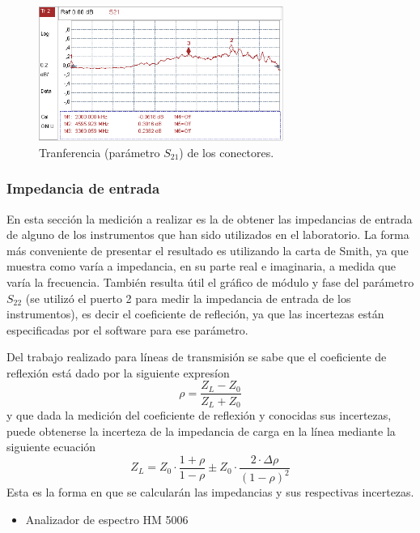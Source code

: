 \documentclass[a4paper,10pt]{article}
\begin{document}
		\begin{figure}[!htb]
			\centering
			\includegraphics[width=8cm]
			{Imagenes/transferenciaconector.png}
			\caption{Tranferencia (par\'ametro $S_{21}$) de los conectores.}
			\label{tranferenciaconectorrr} 
		\end{figure}
		
		\subsubsection{Impedancia de entrada}
		\indent En esta secci\'on la medici\'on a realizar es la de obtener las 
		impedancias de entrada de alguno de los instrumentos que han sido 
		utilizados en el laboratorio. La forma m\'as conveniente de presentar el
		resultado es utilizando la carta de Smith, ya que muestra como var\'ia a
		impedancia, en su parte real e  imaginaria, a medida que var\'ia la 
		frecuencia. Tambi\'en resulta \'util el gr\'afico de m\'odulo y fase del par\'ametro $S_{22}$ (se utiliz\'o el puerto 2 para medir la impedancia de entrada de los instrumentos), es decir el coeficiente de refleci\'on, ya que las incertezas est\'an especificadas por el software para ese par\'ametro.
		
		Del trabajo realizado para l\'ineas de transmisi\'on se sabe que el coeficiente de reflexi\'on est\'a dado por la siguiente expres\'ion
		$$\rho=\frac{Z_L-Z_0}{Z_L+Z_0}$$
		y que dada la medici\'on del coeficiente de reflexi\'on y conocidas sus incertezas, puede obtenerse la incerteza de la impedancia de carga en la l\'inea mediante la siguiente ecuaci\'on
		\begin{equation}
		Z_L =Z_0\cdot\frac{1+\rho}{1-\rho} \pm Z_0\cdot\frac{2\cdot\Delta\rho}
					{(1 - \rho)^2}
		\label{ecuaciototot}
		\end{equation}
		Esta es la forma en que se calcular\'an las impedancias y sus respectivas incertezas.
		\begin{itemize}
			\item Analizador de espectro HM 5006
		\end{itemize}
		
\end{document}
